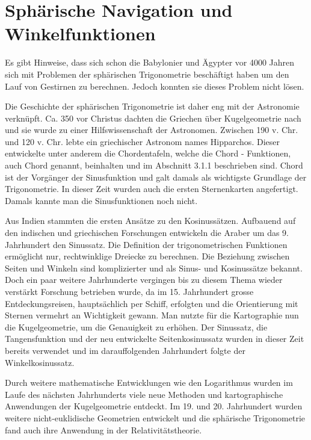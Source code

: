 


\section{Sphärische Navigation und Winkelfunktionen}
Es gibt Hinweise, dass sich schon die Babylonier und Ägypter vor 4000 Jahren sich mit Problemen der sphärischen Trigonometrie beschäftigt haben um den Lauf von Gestirnen zu berechnen. 
Jedoch konnten sie dieses Problem nicht lösen. 

Die Geschichte der sphärischen Trigonometrie ist daher eng mit der Astronomie verknüpft. Ca. 350 vor Christus dachten die Griechen über Kugelgeometrie nach und sie wurde zu einer Hilfswissenschaft der Astronomen. 
Zwischen 190 v. Chr. und 120 v. Chr. lebte ein griechischer Astronom names Hipparchos. 
Dieser entwickelte unter anderem die Chordentafeln, welche die Chord - Funktionen, auch Chord genannt, beinhalten und im Abschnitt 3.1.1 beschrieben sind. 
Chord ist der Vorgänger der Sinusfunktion und galt damals als wichtigste Grundlage der Trigonometrie.
In dieser Zeit wurden auch die ersten Sternenkarten angefertigt. Damals kannte man die Sinusfunktionen noch nicht. 

Aus Indien stammten die ersten Ansätze zu den Kosinussätzen.
Aufbauend auf den indischen und griechischen Forschungen entwickeln die Araber um das 9. Jahrhundert den Sinussatz. 
Die Definition der trigonometrischen Funktionen ermöglicht nur, rechtwinklige Dreiecke zu berechnen. 
Die Beziehung zwischen Seiten und Winkeln sind komplizierter und als Sinus- und Kosinussätze bekannt.
Doch ein paar weitere Jahrhunderte vergingen bis zu diesem Thema wieder verstärkt Forschung betrieben wurde, da im 15. Jahrhundert grosse Entdeckungsreisen, hauptsächlich per Schiff, erfolgten und die Orientierung mit Sternen vermehrt an Wichtigkeit gewann.
Man nutzte für die Kartographie nun die Kugelgeometrie, um die Genauigkeit zu erhöhen.
Der Sinussatz, die Tangensfunktion und der neu entwickelte Seitenkosinussatz wurden in dieser Zeit bereits verwendet und im darauffolgenden Jahrhundert folgte der Winkelkosinussatz. 

Durch weitere mathematische Entwicklungen wie den Logarithmus wurden im Laufe des nächsten Jahrhunderts viele neue Methoden und kartographische Anwendungen der Kugelgeometrie entdeckt. 
Im 19. und 20. Jahrhundert wurden weitere nicht-euklidische Geometrien entwickelt und die sphärische Trigonometrie fand auch ihre Anwendung in der Relativitätstheorie.